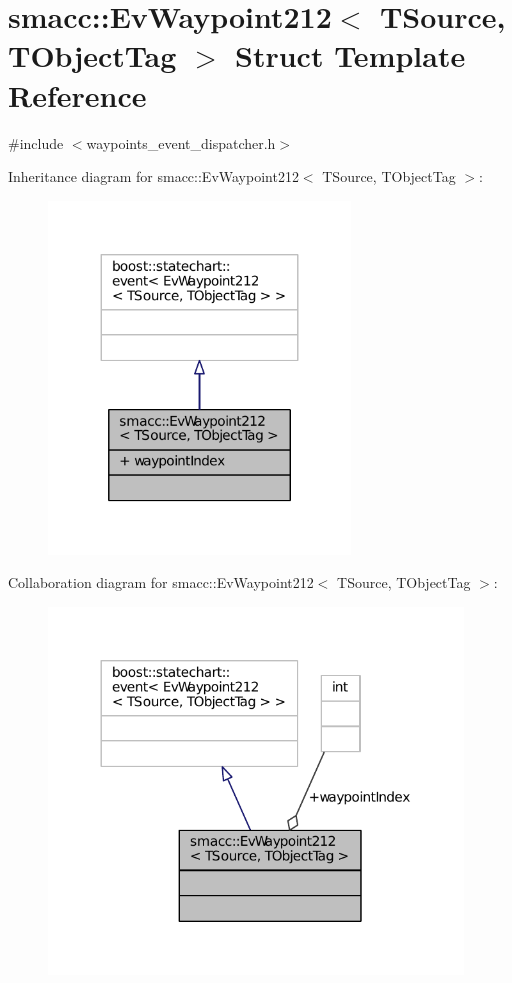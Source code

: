 \hypertarget{structsmacc_1_1EvWaypoint212}{}\section{smacc\+:\+:Ev\+Waypoint212$<$ T\+Source, T\+Object\+Tag $>$ Struct Template Reference}
\label{structsmacc_1_1EvWaypoint212}


{\ttfamily \#include $<$waypoints\+\_\+event\+\_\+dispatcher.\+h$>$}



Inheritance diagram for smacc\+:\+:Ev\+Waypoint212$<$ T\+Source, T\+Object\+Tag $>$\+:
\nopagebreak
\begin{figure}[H]
\begin{center}
\leavevmode
\includegraphics[width=227pt]{structsmacc_1_1EvWaypoint212__inherit__graph}
\end{center}
\end{figure}


Collaboration diagram for smacc\+:\+:Ev\+Waypoint212$<$ T\+Source, T\+Object\+Tag $>$\+:
\nopagebreak
\begin{figure}[H]
\begin{center}
\leavevmode
\includegraphics[width=312pt]{structsmacc_1_1EvWaypoint212__coll__graph}
\end{center}
\end{figure}
